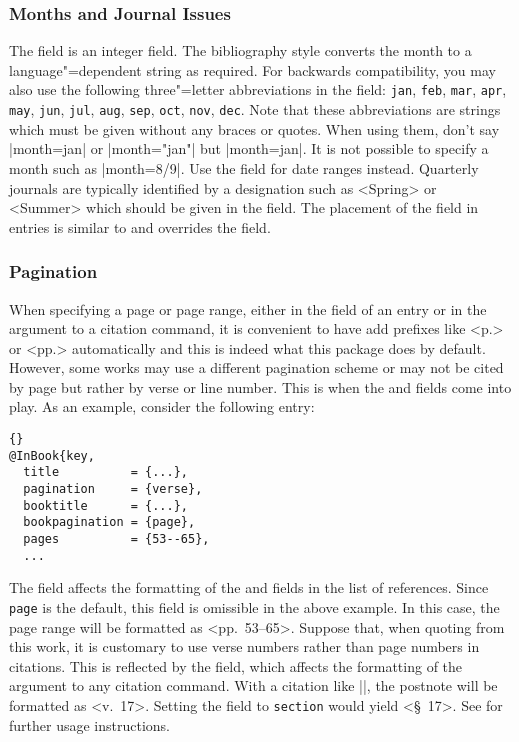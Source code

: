 \documentclass{ltxdockit}[2011/03/25]
\begin{document}
\subsubsection{Months and Journal Issues}
\label{bib:use:iss}

The  field is an integer field. The bibliography style converts the month to a language"=dependent string as required. For backwards compatibility, you may also use the following three"=letter abbreviations in the  field: \texttt{jan}, \texttt{feb}, \texttt{mar}, \texttt{apr}, \texttt{may}, \texttt{jun}, \texttt{jul}, \texttt{aug}, \texttt{sep}, \texttt{oct}, \texttt{nov}, \texttt{dec}. Note that these abbreviations are \bibtex strings which must be given without any braces or quotes. When using them, don't say |month={jan}| or |month="jan"| but |month=jan|. It is not possible to specify a month such as |month={8/9}|. Use the  field for date ranges instead. Quarterly journals are typically identified by a designation such as <Spring> or <Summer> which should be given in the  field. The placement of the  field in  entries is similar to and overrides the  field.

\subsubsection{Pagination}
\label{bib:use:pag}

When specifying a page or page range, either in the  field of an entry or in the  argument to a citation command, it is convenient to have  add prefixes like <p.> or <pp.> automatically and this is indeed what this package does by default. However, some works may use a different pagination scheme or may not be cited by page but rather by verse or line number. This is when the  and  fields come into play. As an example, consider the following entry:

\begin{lstlisting}[style=bibtex]{}
@InBook{key,
  title          = {...},
  pagination     = {verse},
  booktitle      = {...},
  bookpagination = {page},
  pages          = {53--65},
  ...
\end{lstlisting}
%
The  field affects the formatting of the  and  fields in the list of references. Since \texttt{page} is the default, this field is omissible in the above example. In this case, the page range will be formatted as <pp.~53--65>. Suppose that, when quoting from this work, it is customary to use verse numbers rather than page numbers in citations. This is reflected by the  field, which affects the formatting of the  argument to any citation command. With a citation like |\cite[17]{key}|, the postnote will be formatted as <v.~17>. Setting the  field to \texttt{section} would yield <\S~17>. See  for further usage instructions.
\end{document}
